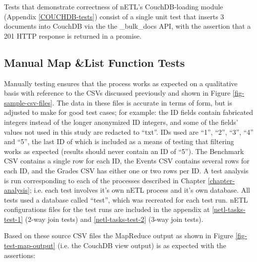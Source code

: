 Tests that demonstrate correctness of nETL's CouchDB-loading module (Appendix \ref{COUCHDB-tests}) consist of a single unit test that inserts 3 documents into CouchDB via the the \_bulk\_docs API, with the assertion that a 201 HTTP response is returned in a promise.

\subsection{Manual Map \&List Function Tests}
Manually testing ensures that the process works as expected on a qualitative basis with reference to the CSVs discussed previously and shown in Figure \ref{fig-sample-csv-files}. The data in these files is accurate in terms of form, but is adjusted to make for good test cases; for example: the ID fields contain fabricated integers instead of the longer anonymized ID integers, and some of the fields' values not used in this study are redacted to ``txt''. IDs used are ``1'', ``2'', ``3'', ``4'' and ``5'', the last ID of which is included as a means of testing that filtering works as expected (results should never contain an ID of ``5''). The Benchmark CSV contains a single row for each ID, the Events CSV contains several rows for each ID, and the Grades CSV has either one or two rows per ID. A test analysis is run corresponding to each of the processes described in Chapter \ref{chapter-analysis}; i.e. each test involves it's own nETL process and it's own database. All tests used a database called ``test'', which was recreated for each test run. nETL configurations files for the test runs are included in the appendix at \ref{netl-tasks-test-1} (2-way join tests) and \ref{netl-tasks-test-2} (3-way join tests).

Based on these source CSV files the MapReduce output as shown in Figure \ref{fig-test-map-output} (i.e. the CouchDB view output) is as expected with the assertions:

